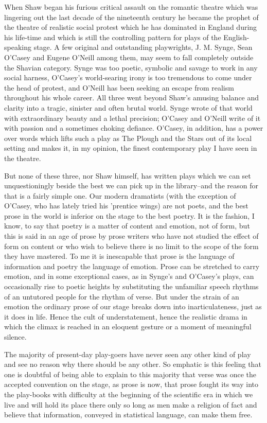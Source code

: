 \documentclass[9pt,twoside]{extarticle}
\begin{document}
When Shaw began his furious critical assault on the romantic theatre which was lingering out the last decade of the nineteenth century he became the prophet of the theatre of realistic social protest which he has dominated in England during his life-time and which is still the controlling pattern for plays of the English-speaking stage. A few original and outstanding playwrights, J. M. Synge, Sean O'Casey and Eugene O'Neill among them, may seem to fall completely outside the Shavian category. Synge was too poetic, symbolic and savage to work in any social harness, O'Casey's world-searing irony is too tremendous to come under the head of protest, and O'Neill has been seeking an escape from realism throughout his whole career. All three went beyond Shaw's amusing balance and clarity into a tragic, sinister and often brutal world. Synge wrote of that world with extraordinary beauty and a lethal precision; O'Casey and O'Neill write of it with passion and a sometimes choking defiance. O'Casey, in addition, has a power over words which lifts such a play as The Plough and the Stars out of its local setting and makes it, in my opinion, the finest contemporary play I have seen in the theatre.

But none of these three, nor Shaw himself, has written plays which we can set unquestioningly beside the best we can pick up in the library--and the reason for that is a fairly simple one. Our modern dramatists (with the exception of O'Casey, who has lately tried his 'prentice wings) are not poets, and the best prose in the world is inferior on the stage to the best poetry. It is the fashion, I know, to say that poetry is a matter of content and emotion, not of form, but this is said in an age of prose by prose writers who have not studied the effect of form on content or who wish to believe there is no limit to the scope of the form they have mastered. To me it is inescapable that prose is the language of information and poetry the language of emotion. Prose can be stretched to carry emotion, and in some exceptional cases, as in Synge's and O'Casey's plays, can occasionally rise to poetic heights by substituting the unfamiliar speech rhythms of an untutored people for the rhythm of verse. But under the strain of an emotion the ordinary prose of our stage breaks down into inarticulateness, just as it does in life. Hence the cult of understatement, hence the realistic drama in which the climax is reached in an eloquent gesture or a moment of meaningful silence.

The majority of present-day play-goers have never seen any other kind of play and see no reason why there should be any other. So emphatic is this feeling that one is doubtful of being able to explain to this majority that verse was once the accepted convention on the stage, as prose is now, that prose fought its way into the play-books with difficulty at the beginning of the scientific era in which we live and will hold its place there only so long as men make a religion of fact and believe that information, conveyed in statistical language, can make them free.
\end{document}
